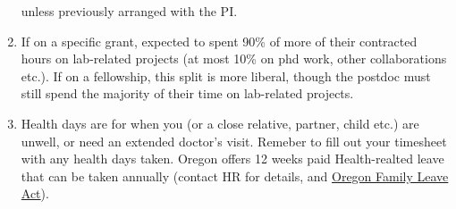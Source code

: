 \documentclass[12pt]{article}
\begin{document}
\begin{enumerate}
  unless previously arranged with the PI.
\item If on a specific grant, expected to spent 90\% of more of
  their contracted hours on lab-related projects (at most 10\%
  on phd work, other collaborations etc.). If on a fellowship,
  this split is more liberal, though the postdoc must still
  spend the majority of their time on lab-related projects.
\item Health days are for when you (or a close relative, partner,
  child etc.) are unwell, or need an extended doctor's visit. Remeber
  to fill out your timesheet with any health days taken. Oregon offers
  12 weeks paid Health-realted leave that can be taken annually
  (contact HR for details, and
  \href{https://www.oregon.gov/boli/workers/pages/oregon-family-leave.aspx}{Oregon
  Family Leave Act}).
\end{enumerate}
\end{document}
